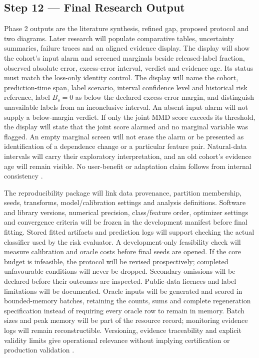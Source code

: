 \documentclass[11pt,a4paper]{article}
\begin{document}
\subsection*{Step 12 --- Final Research Output}
Phase 2 outputs are the literature synthesis, refined gap, proposed protocol
and two diagrams. Later research will populate comparative tables, uncertainty
summaries, failure traces and an aligned evidence display. The display will show
the cohort's input alarm and screened marginals beside released-label fraction,
observed absolute error, excess-error interval, verdict and evidence age.
Its status must match the loss-only identity control. The display will name
the cohort, prediction-time span, label scenario, interval confidence level
and historical risk reference, label $B_s=0$ as below the declared
excess-error margin, and distinguish unavailable labels from an inconclusive
interval. An absent input alarm will not supply a below-margin verdict.
If only the joint MMD score exceeds its threshold, the display will state
that the joint score alarmed and no marginal variable was flagged. An empty
marginal screen will not erase the alarm or be presented as identification
of a dependence change or a particular feature pair.
Natural-data intervals will carry their exploratory interpretation, and an
old cohort's evidence age will remain visible. No user-benefit or adaptation claim follows
from internal consistency \cite{driftvis,souza}.

The reproducibility package will link data provenance, partition membership,
seeds, transforms, model/calibration settings and analysis definitions.
Software and library versions, numerical precision, class/feature order,
optimizer settings and convergence criteria will be frozen in the development
manifest before final fitting. Stored fitted artifacts and prediction logs
will support checking the actual classifier used by the risk evaluator. A
development-only feasibility check will measure calibration and oracle costs
before final seeds are opened. If the core budget is infeasible, the protocol
will be revised prospectively; completed unfavourable conditions will never be
dropped. Secondary omissions will be declared before their outcomes are
inspected. Public-data licences and label limitations will be documented.
Oracle inputs will be generated and scored in bounded-memory batches, retaining
the counts, sums and complete regeneration specification instead of requiring
every oracle row to remain in memory. Batch sizes and peak memory will be part
of the resource record; monitoring evidence logs will remain reconstructible.
Versioning, evidence traceability and explicit validity limits give operational
relevance without implying certification or production validation
\cite{batched,souza,nist,awsquality}.
\end{document}
